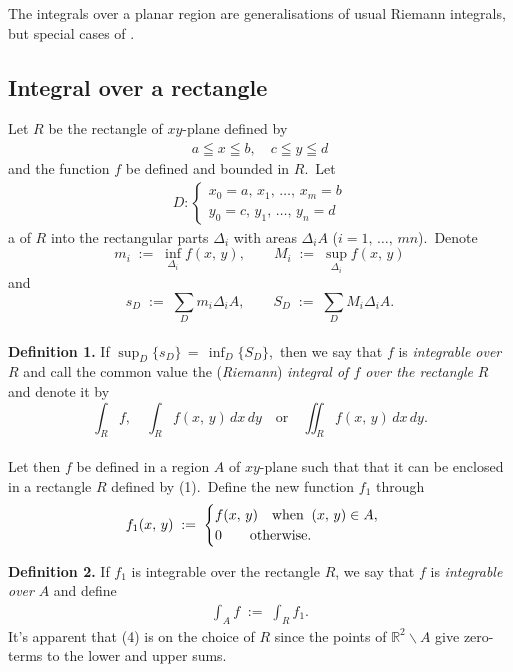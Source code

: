 \documentclass[12pt]{article}
\theoremstyle{definition}
\begin{document}
  
The integrals over a planar region are generalisations of usual Riemann integrals, but special cases of .

\subsection{Integral over a rectangle}
Let $R$ be the rectangle of $xy$-plane defined by
\begin{align}
a \leqq x \leqq b, \quad c \leqq y \leqq d
\end{align}
and the function $f$ be defined and bounded in $R$.\, Let
\begin{align}
D:
\begin{cases}
x_0 = a,\,x_1,\,\ldots,\,x_m = b\\
y_0 = c,\,y_1,\,\ldots,\,y_n = d
\end{cases}
\end{align}
a  of $R$ into the rectangular parts $\Delta_i$ with areas $\Delta_iA$ ($i = 1,\,\ldots,\,mn$).\, Denote
$$m_i \;:=\; \inf_{\Delta_i}f(x,\,y), \qquad M_i \;:=\; \sup_{\Delta_i}f(x,\,y)$$
and 
$$s_D \;:=\; \sum_Dm_i\Delta_iA, \qquad S_D \;:=\; \sum_DM_i\Delta_iA.$$\\

\textbf{Definition 1.}\; If\; $\displaystyle\sup_D\{s_D\} \,=\, \inf_D\{S_D\}$,\, then we say that $f$ is \emph{integrable over} $R$ and call the common value the (\emph{Riemann}) \emph{integral of $f$ over the rectangle} $R$ and denote it by
$$\int_Rf, \quad \int_Rf(x,\,y)\,dx\,dy \quad \mbox{or} \quad \iint_Rf(x,\,y)\,dx\,dy.$$\\


Let then $f$ be defined in a region $A$ of $xy$-plane such that that it can be enclosed in a rectangle $R$ defined by (1).\, Define the new function $f_1$ through
\begin{align}
f_1(x,\,y) \;:=\;
\begin{cases}
f(x,\,y) \quad\mbox{when\;\;} (x,\,y) \in A,\\
0 \qquad\mbox{otherwise.}
\end{cases}
\end{align}

\textbf{Definition 2.}\; If $f_1$ is integrable over the rectangle $R$, we say that $f$ is \emph{integrable over} $A$ and define
\begin{align}
\int_Af \;:=\; \int_Rf_1.
\end{align}
It's apparent that (4) is  on the choice of $R$ since the points of $\mathbb{R}^2\!\smallsetminus\!A$ give zero-terms to the lower and upper sums.
\end{document}

